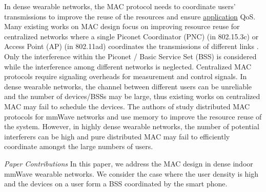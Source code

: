 \documentclass[10pt, conference, letterpaper]{IEEEtran}
\begin{document}
In dense wearable networks, the MAC protocol needs to coordinate users' transmissions to improve the reuse of the resources and ensure \underline{application} QoS. Many existing works on MAC design focus on improving resource reuse for centralized networks where a single Piconet Coordinator (PNC) (in 802.15.3c) or Access Point (AP) (in 802.11ad) coordinates the transmissions of different links \cite{virtualtimeslot}\cite{rex}\cite{fdmac}. Only the interference within the Piconet / Basic Service Set (BSS) is considered while the interference among different networks is neglected. Centralized MAC protocols require signaling overheads for measurement and control signals. In dense wearable networks, the channel between different users can be unreliable and the number of devices/BSSs may be large, thus existing works on centralized MAC may fail to schedule the devices. The authors of \cite{dtdmac}\cite{mdmac} study distributed MAC protocols for mmWave networks and use memory to improve the resource reuse of the system. However, in highly dense wearable networks, the number of potential interferers can be high and pure distributed MAC may fail to efficiently coordinate amongst the large numbers of users. 


\emph{Paper Contributions}
In this paper, we address the MAC design in dense indoor mmWave wearable networks. We consider the case where the user density is high and the devices on a user form a BSS coordinated by the smart phone. %
\end{document}
